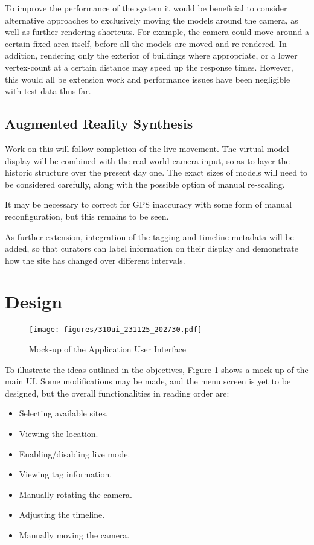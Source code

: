 \documentclass{article}
\begin{document}
To improve the performance of the system it would be beneficial to consider alternative approaches to exclusively moving the models around the camera, as well as further rendering shortcuts. For example, the camera could move around a certain fixed area itself, before all the models are moved and re-rendered. In addition, rendering only the exterior of buildings where appropriate, or a lower vertex-count at a certain distance may speed up the response times. However, this would all be extension work and performance issues have been negligible with test data thus far.

\subsection{Augmented Reality Synthesis}
Work on this will follow completion of the live-movement. The virtual model display will be combined with the real-world camera input, so as to layer the historic structure over the present day one. The exact sizes of models will need to be considered carefully, along with the possible option of manual re-scaling.  

It may be necessary to correct for GPS inaccuracy with some form of manual reconfiguration, but this remains to be seen. 

As further extension, integration of the tagging and timeline metadata will be added, so that curators can label information on their display and demonstrate how the site has changed over different intervals. 

\newpage

\section{Design}

\begin{figure}[H]
    \centering
    \texttt{[image: figures/310ui\_231125\_202730.pdf]}
    \caption{Mock-up of the Application User Interface}
    \label{fig:ui}
\end{figure}

To illustrate the ideas outlined in the objectives, Figure \ref{fig:ui} shows a mock-up of the main UI. Some modifications may be made, and the menu screen is yet to be designed, but the overall functionalities in reading order are: 

\begin{itemize}
    \item Selecting available sites.
    \item Viewing the location.
    \item Enabling/disabling live mode.
    \item Viewing tag information.
    \item Manually rotating the camera.
    \item Adjusting the timeline.
    \item Manually moving the camera.
\end{itemize}
\end{document}
